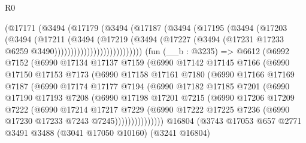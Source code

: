 \begin{lexlean}{R0}
\begin{coremodule}
                        (@17171
                          (@3494
                            (@17179
                              (@3494
                                (@17187
                                  (@3494
                                    (@17195
                                      (@3494
                                        (@17203
                                          (@3494
                                            (@17211
                                              (@3494
                                                (@17219
                                                  (@3494
                                                    (@17227
                                                      (@3494
                                                        (@17231
                                                          @17233
                                                          @6259
                                                          @3490)))))))))))))))))))))))))))
    (fun (__b : @3235) =>
    @6612
      (@6992
        @7152
        (@6990
          @17134
          @17137
          @7159
          (@6990
            @17142
            @17145
            @7166
            (@6990
              @17150
              @17153
              @7173
              (@6990
                @17158
                @17161
                @7180
                (@6990
                  @17166
                  @17169
                  @7187
                  (@6990
                    @17174
                    @17177
                    @7194
                    (@6990
                      @17182
                      @17185
                      @7201
                      (@6990
                        @17190
                        @17193
                        @7208
                        (@6990
                          @17198
                          @17201
                          @7215
                          (@6990
                            @17206
                            @17209
                            @7222
                            (@6990
                              @17214
                              @17217
                              @7229
                              (@6990
                                @17222
                                @17225
                                @7236
                                (@6990 @17230 @17233 @7243 @7245)))))))))))))))
    @16804
    (@3743
      @17053
      @657
      @2771
      @3491
      @3488
      (@3041 @17050 @10160)
      (@3241 @16804)

\end{coremodule}
\end{lexlean}
